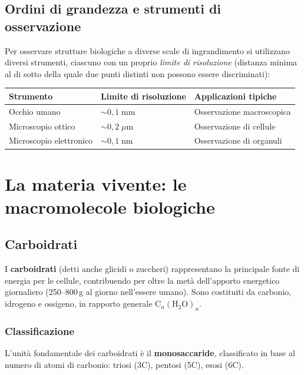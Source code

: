 \documentclass[11pt,a4paper,openright,twoside]{book}
\theoremstyle{definition}
\theoremstyle{plain}
\theoremstyle{remark}
\begin{document}
\subsection{Ordini di grandezza e strumenti di osservazione}

Per osservare strutture biologiche a diverse scale di ingrandimento si utilizzano diversi strumenti, ciascuno con un proprio \textit{limite di risoluzione} (distanza minima al di sotto della quale due punti distinti non possono essere discriminati):

\begin{center}
\begin{tabular}{lll}
\toprule
\textbf{Strumento} & \textbf{Limite di risoluzione} & \textbf{Applicazioni tipiche} \\
\midrule
Occhio umano & $\sim 0{,}1\;\text{mm}$ & Osservazione macroscopica \\
Microscopio ottico & $\sim 0{,}2\;\mu\text{m}$ & Osservazione di cellule \\
Microscopio elettronico & $\sim 0{,}1\;\text{nm}$ & Osservazione di organuli \\
\bottomrule
\end{tabular}
\end{center}

\section{La materia vivente: le macromolecole biologiche}

\subsection{Carboidrati}

I \textbf{carboidrati} (detti anche glicidi o zuccheri) rappresentano la principale fonte di energia per le cellule, contribuendo per oltre la metà dell'apporto energetico giornaliero (250--800\,g al giorno nell'essere umano). Sono costituiti da carbonio, idrogeno e ossigeno, in rapporto generale $\text{C}_n(\text{H}_2\text{O})_n$.

\subsubsection{Classificazione}

L'unità fondamentale dei carboidrati è il \textbf{monosaccaride}, classificato in base al numero di atomi di carbonio: triosi (3C), pentosi (5C), esosi (6C).
\end{document}
